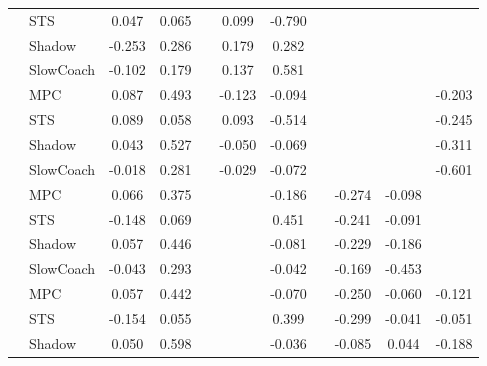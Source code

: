 \begin{tabular}{|l|l|*{9}{c|}}
                                                           & STS &    0.047 &     0.065 &        &  0.099 & -0.790 &     &      &      &       \\
                                                           & Shadow &   -0.253 &     0.286 &        &  0.179 &  0.282 &     &      &      &       \\
                                                           & SlowCoach &   -0.102 &     0.179 &        &  0.137 &  0.581 &     &      &      &       \\
\midrule
[True, True, False, True, True, False, False, False, True] & MPC &    0.087 &     0.493 &        & -0.123 & -0.094 &     &      &      &   -0.203 \\
                                                           & STS &    0.089 &     0.058 &        &  0.093 & -0.514 &     &      &      &   -0.245 \\
                                                           & Shadow &    0.043 &     0.527 &        & -0.050 & -0.069 &     &      &      &   -0.311 \\
                                                           & SlowCoach &   -0.018 &     0.281 &        & -0.029 & -0.072 &     &      &      &   -0.601 \\
\midrule
[True, True, False, False, True, False, True, True, False] & MPC &    0.066 &     0.375 &        &     & -0.186 &     &  -0.274 &  -0.098 &       \\
                                                           & STS &   -0.148 &     0.069 &        &     &  0.451 &     &  -0.241 &  -0.091 &       \\
                                                           & Shadow &    0.057 &     0.446 &        &     & -0.081 &     &  -0.229 &  -0.186 &       \\
                                                           & SlowCoach &   -0.043 &     0.293 &        &     & -0.042 &     &  -0.169 &  -0.453 &       \\
\midrule
[True, True, False, False, True, False, True, True, True] & MPC &    0.057 &     0.442 &        &     & -0.070 &     &  -0.250 &  -0.060 &   -0.121 \\
                                                           & STS &   -0.154 &     0.055 &        &     &  0.399 &     &  -0.299 &  -0.041 &   -0.051 \\
                                                           & Shadow &    0.050 &     0.598 &        &     & -0.036 &     &  -0.085 &   0.044 &   -0.188 \\

\end{tabular}
